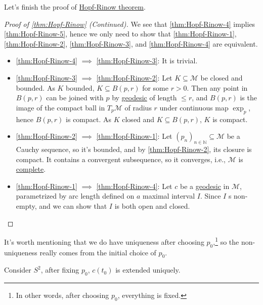 Let's finish the proof of \hyperref[thm:Hopf-Rinow]{Hopf-Rinow theorem}.

\begin{proof}[Proof of \autoref{thm:Hopf-Rinow} (Continued)]
	We see that \autoref{thm:Hopf-Rinow-4} implies \autoref{thm:Hopf-Rinow-5}, hence we only need to show that \autoref{thm:Hopf-Rinow-1}, \autoref{thm:Hopf-Rinow-2}, \autoref{thm:Hopf-Rinow-3}, and \autoref{thm:Hopf-Rinow-4} are equivalent.
	\begin{itemize}
		\item \autoref{thm:Hopf-Rinow-4} \(\implies \) \autoref{thm:Hopf-Rinow-3}: It is trivial.
		\item \autoref{thm:Hopf-Rinow-3} \(\implies \) \autoref{thm:Hopf-Rinow-2}: Let \(K \subseteq \mathcal{M} \) be closed and bounded. As \(K\) bounded, \(K \subseteq B(p, r)\) for some \(r > 0\). Then any point in \(B(p, r)\) can be joined with \(p\) by \hyperref[def:geodesic]{geodesic} of length \(\leq r\), and \(B(p, r)\) is the image of the compact ball in \(T_p \mathcal{M} \) of radius \(r\) under continuous map \(\exp _p\), hence \(B(p, r)\) is compact. As \(K\) closed and \(K \subseteq B(p, r)\), \(K\) is compact.
		\item \autoref{thm:Hopf-Rinow-2} \(\implies \) \autoref{thm:Hopf-Rinow-1}: Let \((p_n)_{n \in \mathbb{N} } \subseteq \mathcal{M} \) be a Cauchy sequence, so it's bounded, and by \autoref{thm:Hopf-Rinow-2}, its closure is compact. It contains a convergent subsequence, so it converges, i.e., \(\mathcal{M} \) is \hyperref[def:geodesically-complete]{complete}.
		\item \autoref{thm:Hopf-Rinow-1} \(\implies \) \autoref{thm:Hopf-Rinow-4}: Let \(c\) be a \hyperref[def:geodesic]{geodesic} in \(\mathcal{M} \), parametrized by arc length defined on \(a\) maximal interval \(I\). Since \(I\) s non-empty, and we can show that \(I\) is both open and closed.
	\end{itemize}
\end{proof}

\begin{remark}
	It's worth mentioning that we do have uniqueness after choosing \(p_0\),\footnote{In other words, after choosing \(p_0\), everything is fixed.} so the non-uniqueness really comes from the initial choice of \(p_0\).
\end{remark}

\begin{eg}
	Consider \(S^2\), after fixing \(p_0\), \(c(t_0)\) is extended uniquely.
	\begin{center}
	\end{center}
\end{eg}

